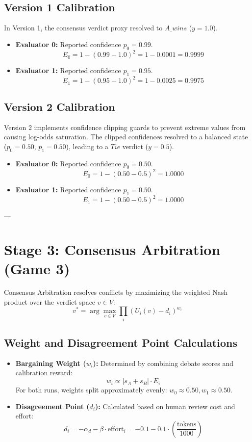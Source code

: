 \documentclass[11pt]{article}
\begin{document}
\subsection{Version 1 Calibration}
In Version 1, the consensus verdict proxy resolved to $A\_wins$ ($y=1.0$).
\begin{itemize}
    \item \textbf{Evaluator 0:} Reported confidence $p_0 = 0.99$.
    \[ E_0 = 1 - (0.99 - 1.0)^2 = 1 - 0.0001 = 0.9999 \]
    \item \textbf{Evaluator 1:} Reported confidence $p_1 = 0.95$.
    \[ E_1 = 1 - (0.95 - 1.0)^2 = 1 - 0.0025 = 0.9975 \]
\end{itemize}

\subsection{Version 2 Calibration}
Version 2 implements confidence clipping guards to prevent extreme values from causing log-odds saturation. The clipped confidences resolved to a balanced state ($p_0 = 0.50$, $p_1 = 0.50$), leading to a $Tie$ verdict ($y=0.5$).
\begin{itemize}
    \item \textbf{Evaluator 0:} Reported confidence $p_0 = 0.50$.
    \[ E_0 = 1 - (0.50 - 0.5)^2 = 1.0000 \]
    \item \textbf{Evaluator 1:} Reported confidence $p_1 = 0.50$.
    \[ E_1 = 1 - (0.50 - 0.5)^2 = 1.0000 \]
\end{itemize}

---

\section{Stage 3: Consensus Arbitration (Game 3)}
Consensus Arbitration resolves conflicts by maximizing the weighted Nash product over the verdict space $v \in V$:
\begin{equation}
v^* = \arg\max_{v \in V} \prod_i (U_i(v) - d_i)^{w_i}
\end{equation}

\subsection{Weight and Disagreement Point Calculations}
\begin{itemize}
    \item \textbf{Bargaining Weight ($w_i$):} Determined by combining debate scores and calibration reward:
    \[ w_i \propto |s_A + s_B| \cdot E_i \]
    For both runs, weights split approximately evenly: $w_0 \approx 0.50, w_1 \approx 0.50$.
    \item \textbf{Disagreement Point ($d_i$):} Calculated based on human review cost and effort:
    \[ d_i = -\alpha_d - \beta \cdot \text{effort}_i = -0.1 - 0.1 \cdot \left(\frac{\text{tokens}}{1000}\right) \]
\end{itemize}
\end{document}
